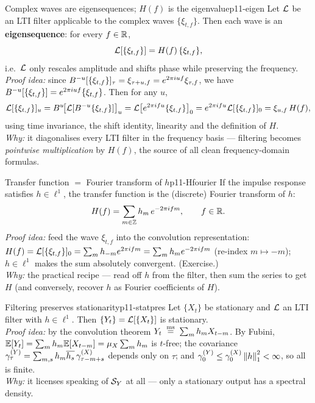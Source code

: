 \begin{theorem}{Complex waves are eigensequences; $H(f)$ is the eigenvalue}{p11-eigen}
Let $\mathcal{L}$ be an LTI filter applicable to the complex waves $\{\xi_{t,f}\}$.
Then each wave is an \textbf{eigensequence}: for every $f\in\mathbb{R}$,
\[
\mathcal{L}[\{\xi_{t,f}\}]=H(f)\,\{\xi_{t,f}\},
\]
i.e.\ $\mathcal{L}$ only rescales amplitude and shifts phase while preserving the
frequency.\\[2pt]
\textit{Proof idea:} since
$B^{-u}[\{\xi_{t,f}\}]_\tau=\xi_{\tau+u,f}=e^{2\pi i u f}\xi_{\tau,f}$, we have
$B^{-u}[\{\xi_{t,f}\}]=e^{2\pi i u f}\{\xi_{t,f}\}$. Then for any $u$,
\[
\mathcal{L}[\{\xi_{t,f}\}]_u
=B^{u}\!\big[\mathcal{L}[B^{-u}\{\xi_{t,f}\}]\big]_u
=\mathcal{L}\big[e^{2\pi i f u}\{\xi_{t,f}\}\big]_0
=e^{2\pi i f u}\mathcal{L}[\{\xi_{t,f}\}]_0=\xi_{u,f}\,H(f),
\]
using time invariance, the shift identity, linearity and the definition of $H$.\\
\textit{Why:} it diagonalises every LTI filter in the frequency basis ---
filtering becomes \emph{pointwise multiplication} by $H(f)$, the source of all
clean frequency-domain formulas.
\end{theorem}

\begin{theorem}{Transfer function $=$ Fourier transform of $h$}{p11-Hfourier}
If the impulse response satisfies $h\in\ell^1$, the transfer function is the
(discrete) Fourier transform of $h$:
\[
H(f)=\sum_{m\in\mathbb{Z}}h_m\,e^{-2\pi i f m},\qquad f\in\mathbb{R} .
\]
\textit{Proof idea:} feed the wave $\xi_{t,f}$ into the convolution
representation: $H(f)=\mathcal{L}[\{\xi_{t,f}\}]_0=\sum_m h_{-m}e^{2\pi i f m}
=\sum_m h_m e^{-2\pi i f m}$ (re-index $m\mapsto -m$); $h\in\ell^1$ makes the sum
absolutely convergent. (Exercise.)\\
\textit{Why:} the practical recipe --- read off $h$ from the filter, then sum the
series to get $H$ (and conversely, recover $h$ as Fourier coefficients of $H$).
\end{theorem}

\begin{theorem}{Filtering preserves stationarity}{p11-statpres}
Let $\{X_t\}$ be stationary and $\mathcal{L}$ an LTI filter with $h\in\ell^1$. Then
$\{Y_t\}=\mathcal{L}[\{X_t\}]$ is stationary.\\[2pt]
\textit{Proof idea:} by the convolution theorem $Y_t\;\overset{\mathrm{ms}}{=}\;\sum_m h_m X_{t-m}$.
By Fubini, $\mathbb{E}[Y_t]=\sum_m h_m\mathbb{E}[X_{t-m}]=\mu_X\sum_m h_m$ is $t$-free; the
covariance
$\gamma^{(Y)}_\tau=\sum_{m,s}h_m\overline{h_s}\,\gamma^{(X)}_{\tau-m+s}$
depends only on $\tau$; and $\gamma^{(Y)}_0\le\gamma^{(X)}_0\left\lVert h \right\rVert_1^2<\infty$,
so all is finite.\\
\textit{Why:} it licenses speaking of $\mathcal{S}_Y$ at all --- only a stationary
output has a spectral density.
\end{theorem}

